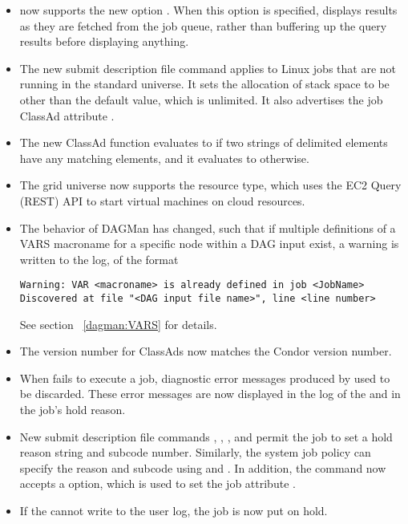 \begin{itemize}
\item {} now supports the new option .
  When this option is specified,  displays results as they
  are fetched from the job queue, rather than buffering up the query
  results before displaying anything.

\item The new submit description file command  
  applies to Linux jobs that are not running in the standard universe. 
  It sets the allocation of stack space to be other than the default
  value, which is unlimited.
  It also advertises the job ClassAd attribute .

\item The new ClassAd function  evaluates to 
   if two strings of delimited elements have any matching elements,
  and it evaluates to  otherwise.

\item The grid universe now supports the  resource type,
  which uses the EC2 Query (REST) API to start virtual machines on cloud
  resources.

\item The behavior of DAGMan has changed, 
such that if multiple definitions of a VARS macroname 
for a specific node within a DAG input exist,
a warning is written to the log, of the format
\begin{verbatim}
Warning: VAR <macroname> is already defined in job <JobName>
Discovered at file "<DAG input file name>", line <line number>
\end{verbatim}
See section ~\ref{dagman:VARS} for details.

\item The version number for ClassAds now matches the Condor version number. 

\item When  fails to execute a job,
diagnostic error messages produced by  used to be discarded.
These error messages are now displayed in the log of the  
and in the job's hold reason. 

\item New submit description file commands
, ,
, and 
permit the job to set a hold reason string and subcode number.
Similarly, the system job policy can specify the reason and subcode 
using  and 
.
In addition, the  command now accepts a  option,
which is used to set the job attribute . 

\item If the  cannot write to the user log, 
the job is now put on hold.

\end{itemize}


